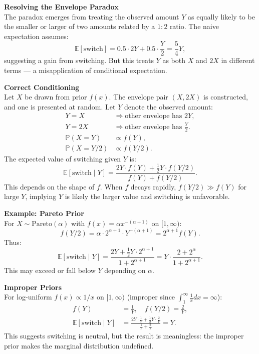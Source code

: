 \begin{technical}
{\Large\textbf{Resolving the Envelope Paradox}}\\[0.3em]

The paradox emerges from treating the observed amount $Y$ as equally likely to be the smaller or larger of two amounts related by a $1:2$ ratio. The naive expectation assumes:
\[
\mathbb{E}[\text{switch}] = 0.5 \cdot 2Y + 0.5 \cdot \frac{Y}{2} = \frac{5}{4}Y,
\]
suggesting a gain from switching. But this treats $Y$ as both $X$ and $2X$ in different terms — a misapplication of conditional expectation.

\textbf{Correct Conditioning}\\[0.2em]
Let $X$ be drawn from prior $f(x)$. The envelope pair $(X, 2X)$ is constructed, and one is presented at random. Let $Y$ denote the observed amount:
\begin{align}
Y = X &\Rightarrow \text{other envelope has } 2Y,\\
Y = 2X &\Rightarrow \text{other envelope has } \frac{Y}{2}.\\[0.3em]
\mathbb{P}(X = Y) &\propto f(Y), \\
\mathbb{P}(X = Y/2) &\propto f(Y/2).
\end{align}
The expected value of switching given $Y$ is:
\[
\mathbb{E}[\text{switch} \mid Y] 
= \frac{2Y \cdot f(Y) + \tfrac{1}{2}Y \cdot f(Y/2)}{f(Y) + f(Y/2)}.
\]
This depends on the shape of $f$. When $f$ decays rapidly, $f(Y/2) \gg f(Y)$ for large $Y$, implying $Y$ is likely the larger value and switching is unfavorable.

\textbf{Example: Pareto Prior}\\[0.2em]
For $X \sim \text{Pareto}(\alpha)$ with $f(x) = \alpha x^{-(\alpha + 1)}$ on $[1, \infty)$:
\[
f(Y/2) = \alpha \cdot 2^{\alpha + 1} \cdot Y^{-(\alpha + 1)} = 2^{\alpha + 1} f(Y).
\]
Thus:
\[
\mathbb{E}[\text{switch} \mid Y] = \frac{2Y + \tfrac{1}{2}Y \cdot 2^{\alpha + 1}}{1 + 2^{\alpha + 1}} = Y \cdot \frac{2 + 2^{\alpha}}{1 + 2^{\alpha + 1}}.
\]
This may exceed or fall below $Y$ depending on $\alpha$.

\textbf{Improper Priors}\\[0.2em]
For log-uniform $f(x) \propto 1/x$ on $[1, \infty)$ (improper since $\int_1^{\infty} \frac{1}{x} dx = \infty$):
\begin{align}
f(Y) &= \frac{1}{Y}, \quad f(Y/2) = \frac{2}{Y},\\
\mathbb{E}[\text{switch} \mid Y] &= \frac{2Y \cdot \frac{1}{Y} + \tfrac{1}{2}Y \cdot \frac{2}{Y}}{\frac{1}{Y} + \frac{2}{Y}} = Y.
\end{align}
This suggests switching is neutral, but the result is meaningless: the improper prior makes the marginal distribution undefined. 


\end{technical}
